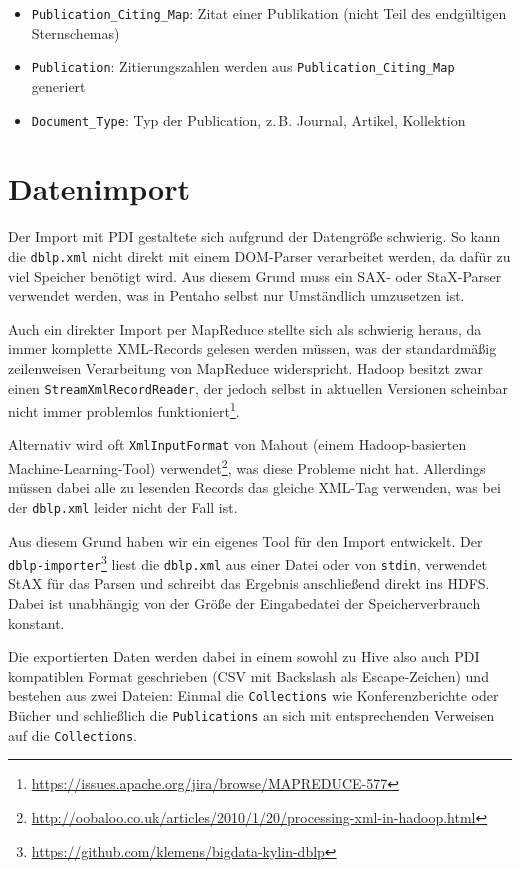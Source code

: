 \documentclass[a4paper,11pt,utf8]{scrartcl}
\begin{document}
\begin{itemize}
    \item \texttt{Publication\_Citing\_Map}: Zitat einer Publikation (nicht Teil des endgültigen Sternschemas)
    \item \texttt{Publication}: Zitierungszahlen werden aus \texttt{Publication\_Citing\_Map} generiert
    \item \texttt{Document\_Type}: Typ der Publication, z.\,B. Journal, Artikel, Kollektion
\end{itemize}

\section{Datenimport}

Der Import mit PDI gestaltete sich aufgrund der Datengröße schwierig. So kann die \texttt{dblp.xml} nicht direkt mit einem DOM-Parser verarbeitet werden, da dafür zu viel Speicher benötigt wird. Aus diesem Grund muss ein SAX- oder StaX-Parser verwendet werden, was in Pentaho selbst nur Umständlich umzusetzen ist.

Auch ein direkter Import per MapReduce stellte sich als schwierig heraus, da immer komplette XML-Records gelesen werden müssen, was der standardmäßig zeilenweisen Verarbeitung von MapReduce widerspricht. Hadoop besitzt zwar einen \texttt{StreamXmlRecordReader}, der jedoch selbst in aktuellen Versionen scheinbar nicht immer problemlos funktioniert\footnote{\url{https://issues.apache.org/jira/browse/MAPREDUCE-577}}.

Alternativ wird oft \texttt{XmlInputFormat} von Mahout (einem Hadoop-basierten Machine-Learning-Tool) verwendet\footnote{\url{http://oobaloo.co.uk/articles/2010/1/20/processing-xml-in-hadoop.html}}, was diese Probleme nicht hat. Allerdings müssen dabei alle zu lesenden Records das gleiche XML-Tag verwenden, was bei der \texttt{dblp.xml} leider nicht der Fall ist.

Aus diesem Grund haben wir ein eigenes Tool für den Import entwickelt. Der \texttt{dblp-importer}\footnote{\url{https://github.com/klemens/bigdata-kylin-dblp}} liest die \texttt{dblp.xml} aus einer Datei oder von \texttt{stdin}, verwendet StAX für das Parsen und schreibt das Ergebnis anschließend direkt ins HDFS. Dabei ist unabhängig von der Größe der Eingabedatei der Speicherverbrauch konstant.

Die exportierten Daten werden dabei in einem sowohl zu Hive also auch PDI kompatiblen Format geschrieben (CSV mit Backslash als Escape-Zeichen) und bestehen aus zwei Dateien: Einmal die \texttt{Collections} wie Konferenzberichte oder Bücher und schließlich die \texttt{Publications} an sich mit entsprechenden Verweisen auf die \texttt{Collections}.
\end{document}
